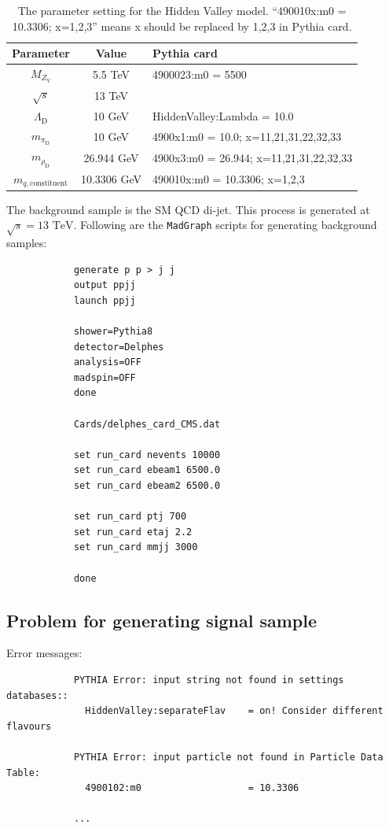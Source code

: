 \documentclass[12pt]{article}
\begin{document}
		\begin{table}[htpb]
			\centering
			\caption{The parameter setting for the Hidden Valley model. ``490010x:m0 = 10.3306; x=1,2,3'' means x should be replaced by 1,2,3 in Pythia card.}
			\label{tab:hv_model_signal_parameter}
			\begin{tabular}{c|c|l}
				Parameter                  & Value       & Pythia card                             \\ \hline
				$M_{Z_V}$                  & 5.5 TeV     & 4900023:m0 = 5500                       \\
				$\sqrt{s}$                 & 13 TeV      &                                         \\
				$\Lambda_{\text{D}}$       & 10 GeV      & HiddenValley:Lambda = 10.0              \\
				$m_{\pi_{\text{D}}}$       & 10 GeV      & 4900x1:m0 = 10.0; x=11,21,31,22,32,33   \\
				$m_{\rho_{\text{D}}}$      & 26.944 GeV  & 4900x3:m0 = 26.944; x=11,21,31,22,32,33 \\
				$m_{q,\text{constituent}}$ & 10.3306 GeV & 490010x:m0 = 10.3306; x=1,2,3          
			\end{tabular}
		\end{table}

		The background sample is the SM QCD di-jet. This process is generated at $\sqrt{s} = \text{13 TeV}$. Following are the \verb|MadGraph| scripts for generating background samples:	
		\begin{verbatim}
			generate p p > j j
			output ppjj
			launch ppjj

			shower=Pythia8
			detector=Delphes
			analysis=OFF
			madspin=OFF
			done

			Cards/delphes_card_CMS.dat

			set run_card nevents 10000
			set run_card ebeam1 6500.0
			set run_card ebeam2 6500.0

			set run_card ptj 700
			set run_card etaj 2.2
			set run_card mmjj 3000

			done	
		\end{verbatim}
	\subsection{Problem for generating signal sample}%
	\label{sub:problem_for_generating_signal_sample}
		Error messages:
		\begin{verbatim}
			PYTHIA Error: input string not found in settings databases::
			  HiddenValley:separateFlav    = on! Consider different flavours

			PYTHIA Error: input particle not found in Particle Data Table:
			  4900102:m0                   = 10.3306

			...
		\end{verbatim}
\end{document}
